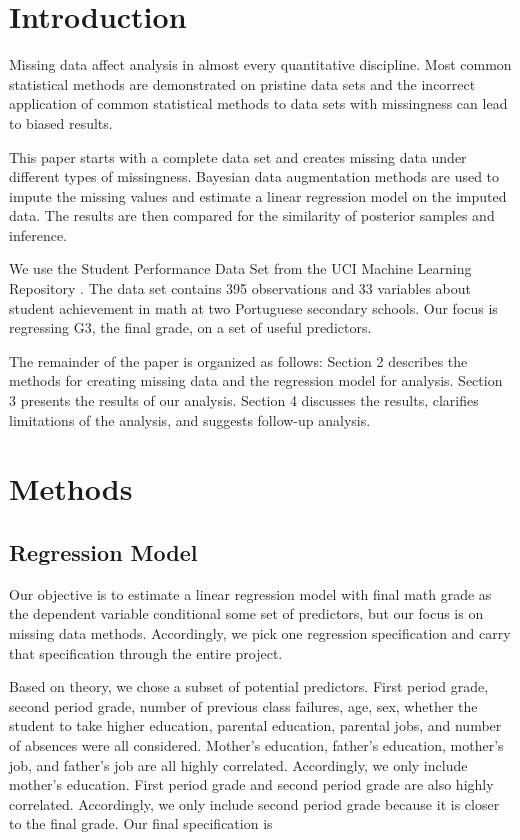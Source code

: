 \documentclass[11pt]{article}
\begin{document}
\section{Introduction}

Missing data affect analysis in almost every quantitative discipline. Most common statistical methods are demonstrated on pristine data sets and the incorrect application of common statistical methods to data sets with missingness can lead to biased results. 

This paper starts with a complete data set and creates missing data under different types of missingness. Bayesian data augmentation methods are used to impute the missing values and estimate a linear regression model on the imputed data. The results are then compared for the similarity of posterior samples and inference.

We use the Student Performance Data Set from the UCI Machine Learning Repository \cite{Cortez2008}. The data set contains 395 observations and 33 variables about student achievement in math at two Portuguese secondary schools. Our focus is regressing G3, the final grade, on a set of useful predictors.  

The remainder of the paper is organized as follows: Section 2 describes the methods for creating missing data and the regression model for analysis. Section 3 presents the results of our analysis. Section 4 discusses the results, clarifies limitations of the analysis, and suggests follow-up analysis. 

\section{Methods}

\subsection{Regression Model}

Our objective is to estimate a linear regression model with final math grade as the dependent variable conditional some set of predictors, but our focus is on missing data methods. Accordingly, we pick one regression specification and carry that specification through the entire project. 

Based on theory, we chose a subset of potential predictors. First period grade, second period grade, number of previous class failures, age, sex, whether the student to take higher education, parental education, parental jobs, and number of absences were all considered. Mother's education, father's education, mother's job, and father's job are all highly correlated. Accordingly, we only include mother's education. First period grade and second period grade are also highly correlated. Accordingly, we only include second period grade because it is closer to the final grade. Our final specification is 
\end{document}
